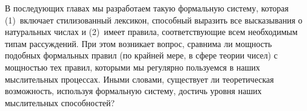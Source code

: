 \documentclass[../main.tex]{subfiles}
\begin{document}
В последующих главах мы разработаем такую формальную систему, которая (1)~включает стилизованный лексикон, способный выразить все высказывания о натуральных числах и (2)~имеет правила, соответствующие всем необходимым типам рассуждений. При этом возникает вопрос, сравнима ли мощность подобных формальных правил (по крайней мере, в сфере теории чисел) с мощностью тех правил, которыми мы регулярно пользуемся в наших мыслительных процессах. Иными словами, существует ли теоретическая возможность, используя формальную систему, достичь уровня наших мыслительных способностей?
\end{document}
